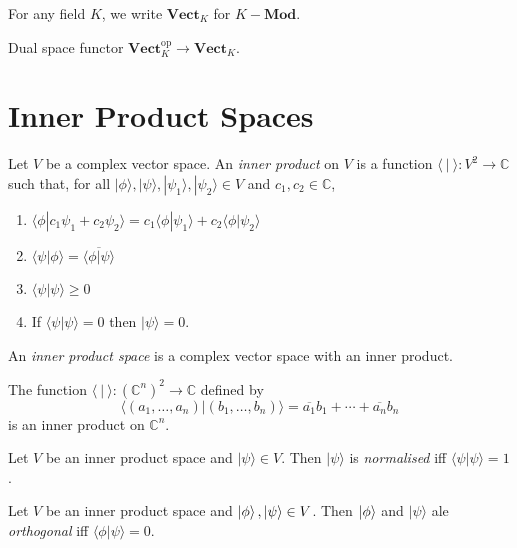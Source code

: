 \begin{df}
For any field $K$, we write $\mathbf{Vect}_K$ for $K-\mathbf{Mod}$.
\end{df}

Dual space functor $\mathbf{Vect}_K^{\mathrm{op}} \rightarrow \mathbf{Vect}_K$.

\section{Inner Product Spaces}

\begin{df}
Let $V$ be a complex vector space. An \emph{inner product} on $V$ is a function $\langle \ | \ \rangle : V^2 \rightarrow \mathbb{C}$ such that, for all $|\phi\rangle, |\psi\rangle, |\psi_1 \rangle, | \psi_2 \rangle \in V$ and $c_1, c_2 \in \mathbb{C}$,
\begin{enumerate}
\item $\langle \phi | c_1 \psi_1 + c_2 \psi_2 \rangle = c_1 \langle \phi | \psi_1 \rangle + c_2 \langle \phi | \psi_2 \rangle$
\item $\langle \psi | \phi \rangle = \overline{\langle \phi | \psi \rangle}$
\item $\langle \psi | \psi \rangle \geq 0$
\item If $\langle \psi | \psi \rangle = 0$ then $|\psi\rangle = 0$.
\end{enumerate}

An \emph{inner product space} is a complex vector space with an inner product.
\end{df}

\begin{ex}
The function $\langle \ | \ \rangle : (\mathbb{C}^n)^2 \rightarrow \mathbb{C}$ defined by
\[ \langle (a_1, \ldots, a_n) | (b_1, \ldots, b_n) \rangle = \overline{a_1} b_1 + \cdots + \overline{a_n} b_n \]
is an inner product on $\mathbb{C}^n$.
\end{ex}

\begin{df}[Normalised]
Let $V$ be an inner product space and $|\psi\rangle \in V$. Then $|\psi\rangle$ is \emph{normalised} iff $\langle \psi | \psi \rangle = 1$.
\end{df} 

\begin{df}[Orthogonal]
Let $V$ be an inner product space and $\left| {\phi} \right\rangle, |\psi\rangle \in V$. Then $\left| {\phi} \right\rangle$ and $|\psi\rangle$ ale \emph{orthogonal} iff $\langle \phi | \psi \rangle = 0$.
\end{df} 


